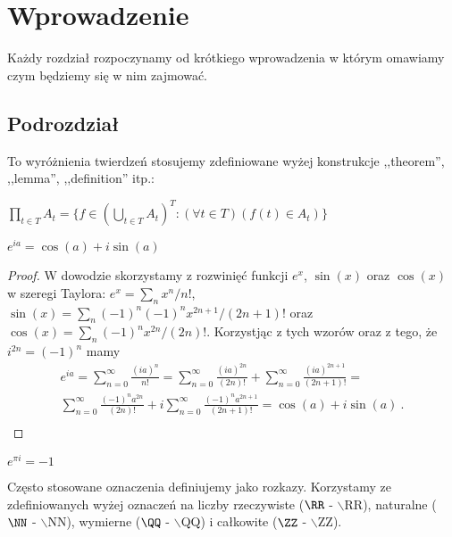 \section{Wprowadzenie}

  Każdy rozdział rozpoczynamy od krótkiego wprowadzenia w którym omawiamy
  czym będziemy się w nim zajmować.

\subsection{Podrozdział}

To wyróżnienia twierdzeń stosujemy zdefiniowane wyżej konstrukcje
,,theorem'', ,,lemma'', ,,definition'' itp.:

\begin{definition}
  $\prod_{t\in T}A_t = \{f \in (\bigcup_{t \in T} A_t)^{T}: (\forall t \in T)(f(t) \in A_t)\}$
\end{definition}


\begin{lemma}
$e^{ia} = \cos(a) + i\sin(a)$
\end{lemma}

\begin{proof} W dowodzie skorzystamy z rozwinięć funkcji $e^x$, $\sin(x)$
oraz $\cos(x)$ w szeregi Taylora: $e^x = \sum_{n} x^n/n!$,
$\sin(x) = \sum_n (-1)^n (-1)^n x^{2n+1}/(2n+1)!$ oraz
$\cos(x) = \sum_n (-1)^n x^{2n}/(2n)!$. Korzystjąc z tych wzorów
oraz z tego, że $i^{2n} = (-1)^n$ mamy
\begin{gather*}
  e^{ia} = \sum_{n=0}^{\infty}\frac{(ia)^n}{n!} =
          \sum_{n=0}^{\infty}\frac{(ia)^{2n}}{(2n)!}
          +\sum_{n=0}^{\infty}\frac{(ia)^{2n+1}}{(2n+1)!}= \\
%
          \sum_{n=0}^{\infty}\frac{(-1)^n a^{2n}}{(2n)!}
         +i \sum_{n=0}^{\infty}\frac{(-1)^n a^{2n+1}}{(2n+1)!}= \cos(a) + i\sin(a) ~.\\
\end{gather*}
\end{proof}

\begin{corollary}
  $e^{\pi i} = -1$
\end{corollary}

Często stosowane oznaczenia definiujemy jako rozkazy. Korzystamy
ze zdefiniowanych wyżej oznaczeń na liczby rzeczywiste ($\RR$ - $\backslash$RR),
naturalne ($\NN$ - $\backslash$NN), wymierne ($\QQ$ - $\backslash$QQ) i całkowite ($\ZZ$ - $\backslash$ZZ).\\

